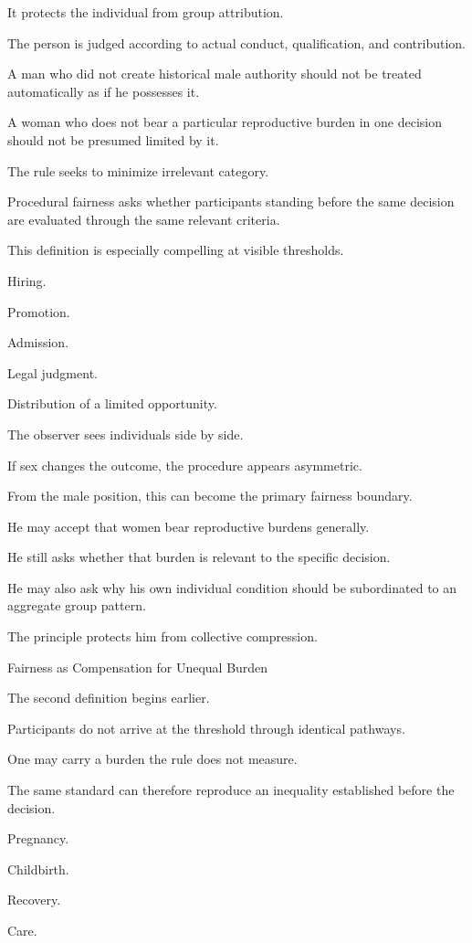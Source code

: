 It protects the individual from group attribution.

The person is judged according to actual conduct, qualification, and contribution.

A man who did not create historical male authority should not be treated automatically as if he possesses it.

A woman who does not bear a particular reproductive burden in one decision should not be presumed limited by it.

The rule seeks to minimize irrelevant category.

Procedural fairness asks whether participants standing before the same decision are evaluated through the same relevant criteria.

This definition is especially compelling at visible thresholds.

Hiring.

Promotion.

Admission.

Legal judgment.

Distribution of a limited opportunity.

The observer sees individuals side by side.

If sex changes the outcome, the procedure appears asymmetric.

From the male position, this can become the primary fairness boundary.

He may accept that women bear reproductive burdens generally.

He still asks whether that burden is relevant to the specific decision.

He may also ask why his own individual condition should be subordinated to an aggregate group pattern.

The principle protects him from collective compression.

Fairness as Compensation for Unequal Burden

The second definition begins earlier.

Participants do not arrive at the threshold through identical pathways.

One may carry a burden the rule does not measure.

The same standard can therefore reproduce an inequality established before the decision.

Pregnancy.

Childbirth.

Recovery.

Care.

